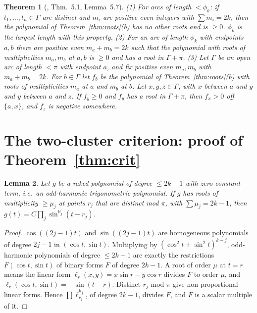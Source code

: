 \documentclass[11pt]{amsart}
\newtheorem{theorem}{Theorem}
\newtheorem{lemma}[theorem]{Lemma}
\theoremstyle{definition}
\begin{document}
\begin{theorem}[\cite{BLN}, Thm.~5.1, Lemma~5.7]\label{thm:BLN}
(1) For arcs of length $<\phi_k$: if $t_1,\dots,t_n\in\Gamma$ are distinct and $m_i$ are positive even integers with $\sum m_i=2k$,
then the polynomial of Theorem~\ref{thm:roots}(b) has no other roots and is $\ge0$. $\phi_k$ is the largest length with this property.
(2) For an arc of length $\phi_k$ with endpoints $a,b$ there are positive even $m_a+m_b=2k$ such that the polynomial with roots of
multiplicities $m_a,m_b$ at $a,b$ is $\ge0$ and has a root in $\Gamma+\pi$.
(3) Let $\Gamma$ be an open arc of length $<\pi$ with endpoint $a$, and fix positive even $m_a,m_b$ with $m_a+m_b=2k$. For $b\in\Gamma$ let
$f_b$ be the polynomial of Theorem~\ref{thm:roots}(b) with roots of multiplicities $m_a$ at $a$ and $m_b$ at $b$. Let $x,y,z\in\Gamma$, with
$x$ between $a$ and $y$ and $y$ between $a$ and $z$. If $f_y\ge0$ and $f_y$ has a root in $\Gamma+\pi$, then $f_x>0$ off $\{a,x\}$, and $f_z$
is negative somewhere.
\end{theorem}

\section{The two-cluster criterion: proof of Theorem~\ref{thm:crit}}

\begin{lemma}\label{lem:factor}
Let $g$ be a raked polynomial of degree $\le2k-1$ with zero constant term, i.e.\ an odd-harmonic trigonometric polynomial.
If $g$ has roots of multiplicity $\ge\mu_j$ at points $r_j$ that are distinct mod $\pi$, with $\sum\mu_j=2k-1$, then
$g(t)=C\prod_j\sin^{\mu_j}(t-r_j)$.
\end{lemma}
\begin{proof}
$\cos((2j-1)t)$ and $\sin((2j-1)t)$ are homogeneous polynomials of degree $2j-1$ in $(\cos t,\sin t)$. Multiplying by
$(\cos^2t+\sin^2t)^{k-j}$, odd-harmonic polynomials of degree $\le2k-1$ are exactly the restrictions $F(\cos t,\sin t)$ of binary forms $F$ of
degree $2k-1$. A root of order $\mu$ at $t=r$ means the linear form $\ell_r(x,y)=x\sin r-y\cos r$ divides $F$ to order $\mu$, and
$\ell_r(\cos t,\sin t)=-\sin(t-r)$. Distinct $r_j$ mod $\pi$ give non-proportional linear forms. Hence $\prod\ell_{r_j}^{\mu_j}$,
of degree $2k-1$, divides $F$, and $F$ is a scalar multiple of it.
\end{proof}
\end{document}

